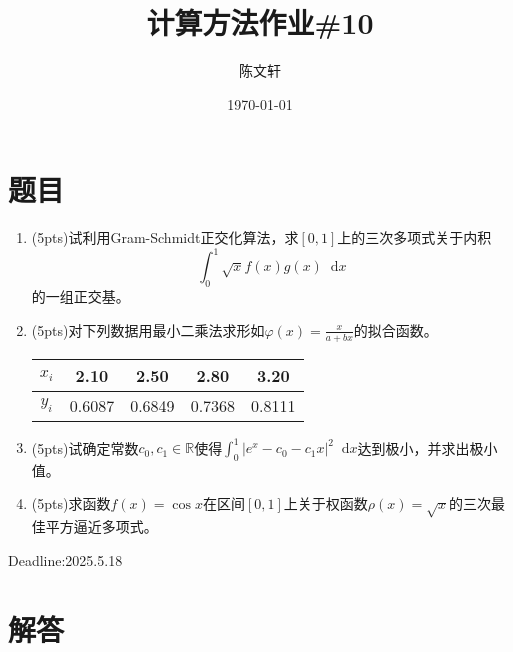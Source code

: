\documentclass[cn,hazy,green,11pt,normal]{elegantnote}
\title{计算方法作业\#10}
\author{陈文轩}
\institute{KFRC}
\date{\today}
\newcommand*{\diff}{\mathop{}\!\mathrm{d}}
\begin{document}
\maketitle

\section{题目}


\begin{enumerate}

    \item (5pts)试利用Gram-Schmidt正交化算法，求$[0,1]$上的三次多项式关于内积\[\int_0^1\sqrt{x}f(x)g(x)\diff x\]的一组正交基。

    \item (5pts)对下列数据用最小二乘法求形如$\varphi(x)=\frac{x}{a+bx}$的拟合函数。

        \begin{table}[H]
            \centering
            \begin{tabular}{|c|c|c|c|c|}
                \hline
                $x_i$ & 2.10 & 2.50 & 2.80 & 3.20 \\
                \hline
                $y_i$ & 0.6087 & 0.6849 & 0.7368 & 0.8111 \\
                \hline
            \end{tabular}
            \label{tab:1}
        \end{table}

    \item (5pts)试确定常数$c_0,c_1\in\mathbb{R}$使得$\int_0^1| e^x-c_0-c_1 x|^2\diff x$达到极小，并求出极小值。

    \item (5pts)求函数$f(x)=\cos x$在区间$[0,1]$上关于权函数$\rho(x)=\sqrt{x}$的三次最佳平方逼近多项式。
\end{enumerate}

    Deadline:2025.5.18

\section{解答}
\end{document}
